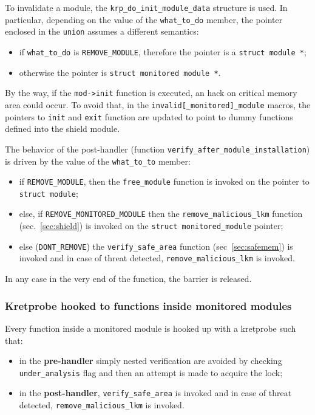 \documentclass{article}
\begin{document}
	To invalidate a module, the \texttt{krp\_do\_init\_module\_data} structure is used. In particular, depending on the
	value of the \texttt{what\_to\_do} member, the pointer enclosed in the \texttt{union} assumes a different semantics:
	\begin{itemize}
		\item if \texttt{what\_to\_do} is \texttt{REMOVE\_MODULE}, therefore the pointer is a \texttt{struct module *};
		\item otherwise the pointer is \texttt{struct monitored module *}.
	\end{itemize}

	By the way, if the \texttt{mod->init} function is executed, an hack on critical memory area could occur. To avoid
	that, in the \texttt{invalid[\_monitored]\_module} macros, the pointers to \texttt{init} and \texttt{exit} function
	are updated to point to dummy functions defined into the shield module.

	The behavior of the post-handler (function \texttt{verify\_after\_module\_installation}) is driven by the value of
	the \texttt{what\_to\_to} member:
	\begin{itemize}
		\item if \texttt{REMOVE\_MODULE}, then the \texttt{free\_module} function is invoked on the pointer to
		\texttt{struct module};
		\item else, if \texttt{REMOVE\_MONITORED\_MODULE} then the \texttt{remove\_malicious\_lkm} function
		(sec.~\ref{sec:shield}) is invoked on the \texttt{struct monitored\_module} pointer;
		\item else (\texttt{DONT\_REMOVE}) the \texttt{verify\_safe\_area} function (sec~\ref{sec:safemem}) is invoked and in case of threat detected, \texttt{remove\_malicious\_lkm} is invoked.
	\end{itemize}

	In any case in the very end of the function, the barrier is released.

	\subsubsection{Kretprobe hooked to functions inside monitored modules}
	Every function inside a monitored module is hooked up with a kretprobe such that:
	\begin{itemize}
		\item in the \textbf{pre-handler} simply nested verification are avoided by checking \texttt{under\_analysis}
		flag and then an attempt is made to acquire the lock;
		\item in the \textbf{post-handler}, \texttt{verify\_safe\_area} is invoked and in case of threat
		detected, \texttt{remove\_malicious\_lkm} is invoked.
	\end{itemize}
\end{document}

